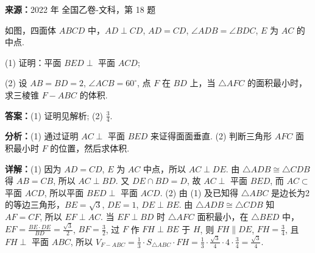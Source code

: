 \begin{question}[points=12]
\textbf{来源：}2022 年 全国乙卷-文科，第 18 题\par
如图，四面体 $ABCD$ 中，$AD\perp CD$, $AD=CD$, $\angle ADB = \angle BDC$, $E$ 为 $AC$ 的中点.

(1) 证明：平面 $BED \perp$ 平面 $ACD$;

(2) 设 $AB=BD=2$, $\angle ACB=60^\circ$, 点 $F$ 在 $BD$ 上，当 $\triangle AFC$ 的面积最小时，求三棱锥 $F-ABC$ 的体积.
\begin{solution}
\textbf{答案：}(1) 证明见解析; (2) $\frac{3}{4}$.

\textbf{分析：}(1) 通过证明 $AC\perp$ 平面 $BED$ 来证得面面垂直.
(2) 判断三角形 $AFC$ 面积最小时 $F$ 的位置，然后求体积.

\textbf{详解：}(1) 因为 $AD=CD$, $E$ 为 $AC$ 中点，所以 $AC\perp DE$. 由 $\triangle ADB \cong \triangle CDB$ 得 $AB=CB$, 所以 $AC\perp BD$. 又 $DE\cap BD=D$, 故 $AC\perp$ 平面 $BED$, 而 $AC\subset$ 平面 $ACD$, 所以平面 $BED \perp$ 平面 $ACD$.
(2) 由 (1) 及已知得 $\triangle ABC$ 是边长为2的等边三角形，$BE=\sqrt{3}$, $DE=1$, $DE\perp BE$. 由 $\triangle ADB\cong\triangle CDB$ 知 $AF=CF$, 所以 $EF\perp AC$. 当 $EF\perp BD$ 时 $\triangle AFC$ 面积最小，在 $\triangle BED$ 中，$EF=\frac{BE\cdot DE}{BD}=\frac{\sqrt{3}}{2}$, $BF=\frac{3}{2}$, 过 $F$ 作 $FH\perp BE$ 于 $H$, 则 $FH\parallel DE$, $FH=\frac{3}{4}$, 且 $FH\perp$ 平面 $ABC$, 所以 $V_{F-ABC}=\frac13\cdot S_{\triangle ABC}\cdot FH = \frac13\cdot\frac{\sqrt{3}}{4}\cdot4\cdot\frac34 = \frac{\sqrt{3}}{4}$.
\end{solution}
\end{question}

